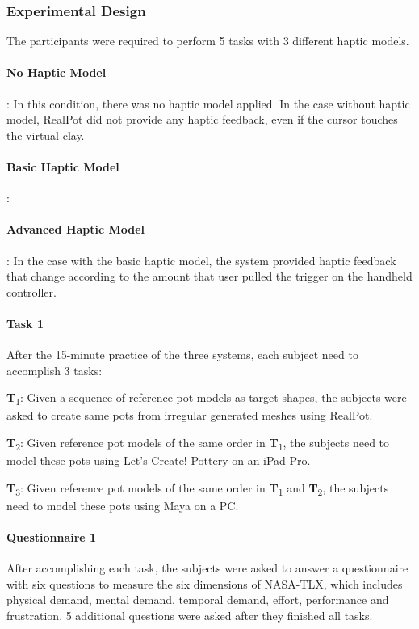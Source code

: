\documentclass{svjour3}                     %
\begin{document}
\subsubsection{Experimental Design}

The participants were required to perform 5 tasks with 3 different haptic models.

\paragraph{No Haptic Model}: In this condition, there was no haptic model applied. In the case without haptic model, RealPot did not provide any haptic feedback, even if the cursor touches the virtual clay.

\paragraph{Basic Haptic Model}: 

\paragraph{Advanced Haptic Model}: In the case with the basic haptic model, the system provided haptic feedback that change according to the amount that user pulled the trigger on the handheld controller.




\paragraph{Task 1} After the 15-minute practice of the three systems, each subject need to accomplish 3 tasks:

\textbf{T}\textsubscript{1}: Given a sequence of reference pot models as target shapes, the subjects were asked to create same pots from irregular generated meshes using RealPot. 

\textbf{T}\textsubscript{2}: Given reference pot models of the same order in \textbf{T}\textsubscript{1}, the subjects need to model these pots using Let's Create! Pottery on an iPad Pro.

\textbf{T}\textsubscript{3}: Given reference pot models of the same order in \textbf{T}\textsubscript{1} and \textbf{T}\textsubscript{2}, the subjects need to model these pots using Maya on a PC.


\paragraph{Questionnaire 1} After accomplishing each task, the subjects were asked to answer a questionnaire with six questions to measure the six dimensions of NASA-TLX, which includes physical demand, mental demand, temporal demand, effort, performance and frustration. 5 additional questions were asked after they finished all tasks.
\end{document}
